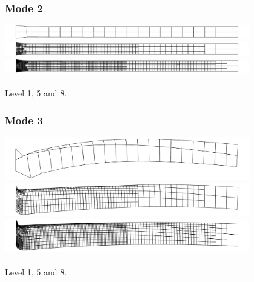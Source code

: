 \documentclass{beamer}
\begin{document}
\begin{frame}
  \frametitle{Mode 2}

  \begin{center}
    \includegraphics[width=0.8\textwidth]{beam/mode-00-01} \\
    \vspace{0.3cm} \includegraphics[width=0.8\textwidth]{beam/mode-04-01} \\
    \vspace{0.3cm} \includegraphics[width=0.8\textwidth]{beam/mode-07-01}
   \\~\\
   Level 1, 5 and 8.
  \end{center}
\end{frame}

\begin{frame}
  \frametitle{Mode 3}

  \begin{center}
    \includegraphics[width=0.8\textwidth]{beam/mode-00-02} \\
    \vspace{0.3cm} \includegraphics[width=0.8\textwidth]{beam/mode-04-02} \\
    \vspace{0.3cm} \includegraphics[width=0.8\textwidth]{beam/mode-07-02}
   \\~\\
   Level 1, 5 and 8.
  \end{center}
\end{frame}
\end{document}
